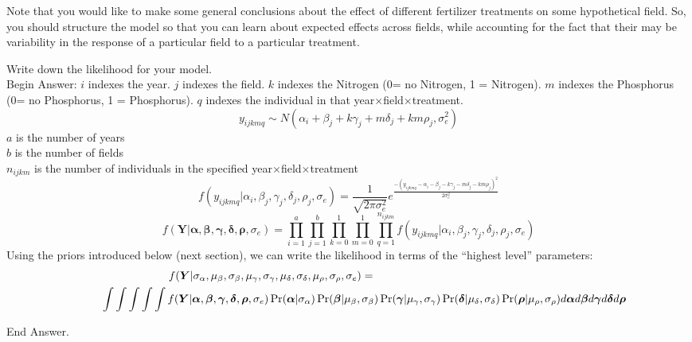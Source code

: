 \documentclass[11pt]{article}
\newcommand{\answer}[1]{{\color{red}\sc Begin Answer: }#1{\color{red}\sc End Answer.\\}}
\begin{document}
Note that you would like to make some general conclusions about the effect of different fertilizer treatments on some hypothetical field.
So, you should structure the model so that you can learn about expected effects across fields, while accounting for the fact that their may be variability in the response of a particular field to a particular treatment.
\newpage
\begin{compactenum}
	\item Write down the likelihood for your model.
	\\\answer{
	$i$ indexes the year. $j$ indexes the field. $k$ indexes the Nitrogen (0= no Nitrogen, 1 = Nitrogen). $m$ indexes the Phosphorus (0= no Phosphorus, 1 = Phosphorus). $q$ indexes the individual in that year$\times$field$\times$treatment.
	$$y_{ijkmq} \sim N(\alpha_i + \beta_j + k\gamma_j + m\delta_j + km\rho_j, \sigma_e^2)$$
	$a$ is the number of years\\
	$b$ is the number of fields\\
	$n_{ijkm}$ is the number of individuals in the specified year$\times$field$\times$treatment\\
	\vskip 1cm
	$$f(y_{ijkmq}|\alpha_i, \beta_j, \gamma_j, \delta_j, \rho_j, \sigma_e) = \frac{1}{\sqrt{2\pi\sigma_e^2}}e^{\frac{-(y_{ijkmq} - \alpha_i - \beta_j - k\gamma_j - m\delta_j - km\rho_j)^2}{2\sigma_e^2}}$$
	\vskip 1cm
	$$f(\bm Y|\bm \alpha, \bm \beta,\bm \gamma,\bm \delta,\bm \rho, \sigma_e) = \prod_{i=1}^a \prod_{j=1}^b\prod_{k=0}^1\prod_{m=0}^1\prod_{q=1}^{n_{ijkm}} f(y_{ijkmq}|\alpha_i, \beta_j, \gamma_j, \delta_j, \rho_j, \sigma_e) $$
	\vskip 1cm
	\normalsize
	Using the priors introduced below (next section), we can write the likelihood in terms of the ``highest level'' parameters:
	\tiny
	\begin{eqnarray*}f(\bm Y|\sigma_{\alpha}, \mu_\beta, \sigma_\beta, \mu_\gamma, \sigma_\gamma, \mu_\delta, \sigma_\delta, \mu_\rho, \sigma_\rho, \sigma_e) = \hskip8cm\\
	\hskip1cm \int\int\int\int\int f(\bm Y|\bm \alpha, \bm \beta,\bm \gamma,\bm \delta,\bm \rho, \sigma_e) \Pr(\bm\alpha|\sigma_{\alpha})\Pr(\bm\beta|\mu_{\beta},\sigma_{\beta})\Pr(\bm\gamma|\mu_{\gamma},\sigma_{\gamma})\Pr(\bm\delta|\mu_{\delta},\sigma_{\delta})\Pr(\bm\rho|\mu_{\rho},\sigma_{\rho})d\bm \alpha d \bm \beta d\bm \gamma d\bm \delta d\bm \rho
	 \end{eqnarray*}
	 
}
\end{compactenum}
\end{document}
